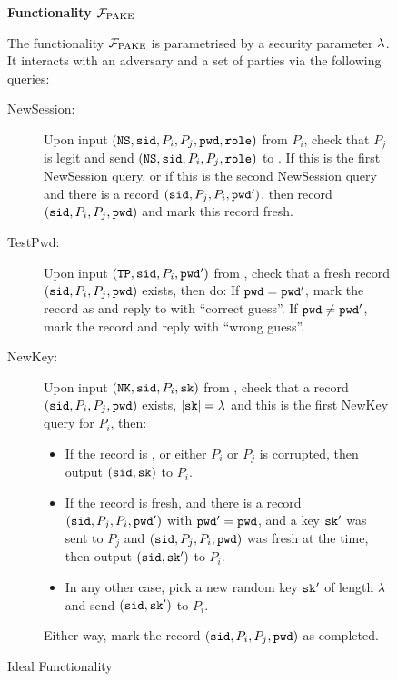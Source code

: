 \begin{figure}[htb]
\begin{mdframed}[innertopmargin=10pt]
\begin{center}
{\bf Functionality $\mathcal{F}_{\mathrm{PAKE}}$}
\end{center}
The functionality $\mathcal{F}_{\mathrm{PAKE}}$ is parametrised by a security parameter $\lambda$. It interacts with an adversary \SIM and a set of parties via the following queries:
\begin{description}
	\item[NewSession:] Upon input $(\mathtt{NS}, \mathtt{sid}, P_i, P_j, \mathtt{pwd}, \mathtt{role})$ from $P_i$, check that $P_j$ is legit and send $(\mathtt{NS}, \mathtt{sid}, P_i, P_j, \mathtt{role})$ to \SIM.
	If this is the first NewSession query, or if this is the second NewSession query and there is a record $(\mathtt{sid}, P_j,P_i,\mathtt{pwd}')$, then record $(\mathtt{sid}, P_i, P_j, \mathtt{pwd})$ and mark this record fresh.
	
	\item[TestPwd:] Upon input $(\mathtt{TP}, \mathtt{sid}, P_i, \mathtt{pwd}')$ from \SIM, check that a fresh record $(\mathtt{sid}, P_i, P_j, \mathtt{pwd})$ exists, then do:
	If $\mathtt{pwd}=\mathtt{pwd}'$, mark the record as \compromised and reply to \SIM with ``correct guess''. If $\mathtt{pwd}\not=\mathtt{pwd}'$, mark the record \interrupted and reply with ``wrong guess''.
	
	\item[NewKey:] Upon input $(\mathtt{NK}, \mathtt{sid}, P_i, \mathtt{sk})$ from \SIM, check that a record $(\mathtt{sid}, P_i, P_j, \mathtt{pwd})$ exists, $|\mathtt{sk}|=\lambda$ and this is the first NewKey query for $P_i$, then:
	\begin{itemize}
		\item If the record is \compromised, or either $P_i$ or $P_j$ is corrupted, then output $(\mathtt{sid},\mathtt{sk})$ to $P_i$.
		\item If the record is fresh, and there is a record $(\mathtt{sid}, P_j, P_i, \mathtt{pwd}')$ with $\mathtt{pwd}'=\mathtt{pwd}$, and a key $\mathtt{sk}'$ was sent to $P_j$ and $(\mathtt{sid}, P_j,P_i,\mathtt{pwd})$ was fresh at the time, then output $(\mathtt{sid},\mathtt{sk}')$ to $P_i$.
		\item In any other case, pick a new random key $\mathtt{sk}'$ of length $\lambda$ and send $(\mathtt{sid},\mathtt{sk}')$ to $P_i$.
	\end{itemize}
	Either way, mark the record $(\mathtt{sid},P_i,P_j,\mathtt{pwd})$ as completed.
	
\end{description}
\end{mdframed}
\caption{Ideal Functionality \FPAKE}
\label{fig:pakef}
\end{figure}

